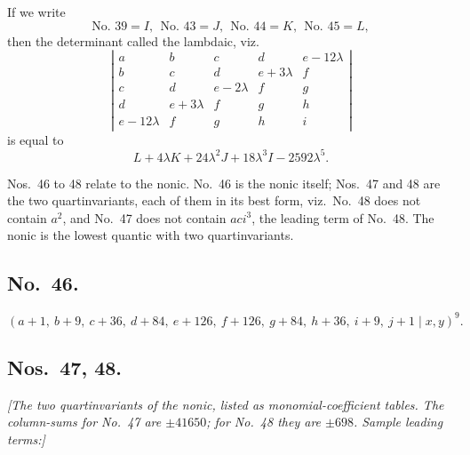 \documentclass[11pt]{article}
\begin{document}
\bigskip

If we write
\[
\text{No.\ 39} = I,\ \ \text{No.\ 43} = J,\ \ \text{No.\ 44} = K,\ \ \text{No.\ 45} = L,
\]
then the determinant called the lambdaic, viz.
\[
\left|\begin{array}{ccccc}
a & b & c & d & e - 12\lambda \\
b & c & d & e + 3\lambda & f \\
c & d & e - 2\lambda & f & g \\
d & e + 3\lambda & f & g & h \\
e - 12\lambda & f & g & h & i
\end{array}\right|
\]
is equal to
\[
L + 4\lambda K + 24\lambda^2 J + 18\lambda^3 I - 2592\lambda^5.
\]

\bigskip

Nos.\ 46 to 48 relate to the nonic. No.\ 46 is the nonic itself; Nos.\ 47 and 48 are the two quartinvariants, each of them in its best form, viz.\ No.\ 48 does not contain $a^2$, and No.\ 47 does not contain $aci^3$, the leading term of No.\ 48. The nonic is the lowest quantic with two quartinvariants.

\subsection*{No.\ 46.}
\[
(a + 1,\ b + 9,\ c + 36,\ d + 84,\ e + 126,\ f + 126,\ g + 84,\ h + 36,\ i + 9,\ j + 1 \mid x, y)^9.
\]

\subsection*{Nos.\ 47, 48.}

\textit{[The two quartinvariants of the nonic, listed as monomial-coefficient tables. The column-sums for No.\ 47 are $\pm 41650$; for No.\ 48 they are $\pm 698$. Sample leading terms:]}

\smallskip
\end{document}

